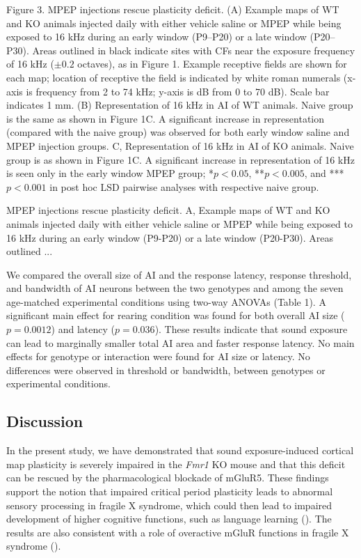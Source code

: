 \begin{changemargin}{1in}{1in}
\footnotesize{Figure 3. MPEP injections rescue plasticity deficit. (A) Example maps of WT and KO animals injected daily with either vehicle saline or MPEP while being exposed to 16 kHz during an early window (P9–P20) or a late window (P20–P30). Areas outlined in black indicate sites with CFs near the exposure frequency of 16 kHz ($\pm0.2$ octaves), as in Figure 1. Example receptive fields are shown for each map; location of receptive the field is indicated by white roman numerals (x-axis is frequency from 2 to 74 kHz; y-axis is dB from 0 to 70 dB). Scale bar indicates 1 mm. (B) Representation of 16 kHz in AI of WT animals. Naive group is the same as shown in Figure 1C. A significant increase in representation (compared with the naive group) was observed for both early window saline and MPEP injection groups. C, Representation of 16 kHz in AI of KO animals. Naive group is as shown in Figure 1C. A significant increase in representation of 16 kHz is seen only in the early window MPEP group; *$p<0.05$, **$p<0.005$, and ***$p<0.001$ in post hoc LSD pairwise analyses with respective naive group.}
\end{changemargin}

MPEP injections rescue plasticity deficit. A, Example maps of WT and KO animals injected daily with either vehicle saline or MPEP while being exposed to 16 kHz during an early window (P9-P20) or a late window (P20-P30). Areas outlined ...

We compared the overall size of AI and the response latency, response threshold, and bandwidth of AI neurons between the two genotypes and among the seven age-matched experimental conditions using two-way ANOVAs (Table 1). A significant main effect for rearing condition was found for both overall AI size ($p=0.0012$) and latency ($p=0.036$). These results indicate that sound exposure can lead to marginally smaller total AI area and faster response latency. No main effects for genotype or interaction were found for AI size or latency. No differences were observed in threshold or bandwidth, between genotypes or experimental conditions.

\subsection{Discussion}

In the present study, we have demonstrated that sound exposure-induced cortical map plasticity is severely impaired in the \textit{Fmr1} KO mouse and that this deficit can be rescued by the pharmacological blockade of mGluR5. These findings support the notion that impaired critical period plasticity leads to abnormal sensory processing in fragile X syndrome, which could then lead to impaired development of higher cognitive functions, such as language learning (\cite{Leblanc2011}). The results are also consistent with a role of overactive mGluR functions in fragile X syndrome (\cite{Bear2004, Dolen2007}).

